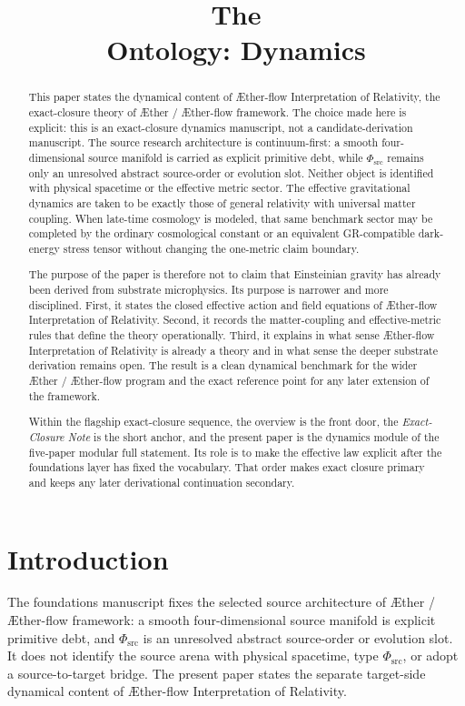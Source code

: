\documentclass[11pt]{article}
\title{The \TheoryName{}\\[0.4em]
Ontology: Dynamics}
\author{}
\date{}
\newcommand{\Aether}{\AE{}ther}
\newcommand{\Aflow}{\AE{}ther-flow}
\newcommand{\TheoryName}{\Aflow{} Interpretation of Relativity}
\newcommand{\TheoryProgram}{\Aether{} / \Aflow{} framework}
\newcommand{\PhiSrc}{\Phi_{\mathrm{src}}}
\begin{document}
\AetherFlowAPATitlePage

\begin{abstract}
This paper states the dynamical content of \TheoryName{}, the exact-closure theory of \TheoryProgram{}. The choice made here is explicit: this is an exact-closure dynamics manuscript, not a candidate-derivation manuscript. The source research architecture is continuum-first: a smooth four-dimensional source manifold is carried as explicit primitive debt, while \(\PhiSrc\) remains only an unresolved abstract source-order or evolution slot. Neither object is identified with physical spacetime or the effective metric sector. The effective gravitational dynamics are taken to be exactly those of general relativity with universal matter coupling. When late-time cosmology is modeled, that same benchmark sector may be completed by the ordinary cosmological constant or an equivalent GR-compatible dark-energy stress tensor without changing the one-metric claim boundary.

The purpose of the paper is therefore not to claim that Einsteinian gravity has already been derived from substrate microphysics. Its purpose is narrower and more disciplined. First, it states the closed effective action and field equations of \TheoryName{}. Second, it records the matter-coupling and effective-metric rules that define the theory operationally. Third, it explains in what sense \TheoryName{} is already a theory and in what sense the deeper substrate derivation remains open. The result is a clean dynamical benchmark for the wider \Aether{} / \Aflow{} program and the exact reference point for any later extension of the framework.

Within the flagship exact-closure sequence, the overview is the front door, the \emph{Exact-Closure Note} is the short anchor, and the present paper is the dynamics module of the five-paper modular full statement. Its role is to make the effective law explicit after the foundations layer has fixed the vocabulary. That order makes exact closure primary and keeps any later derivational continuation secondary.
\end{abstract}

\section{Introduction}

The foundations manuscript fixes the selected source architecture of
\TheoryProgram{}: a smooth four-dimensional source manifold is explicit
primitive debt, and \(\PhiSrc\) is an unresolved abstract source-order or
evolution slot. It does not identify the source arena with physical spacetime,
type \(\PhiSrc\), or adopt a source-to-target bridge. The present paper states
the separate target-side dynamical content of \TheoryName{}.
\end{document}
